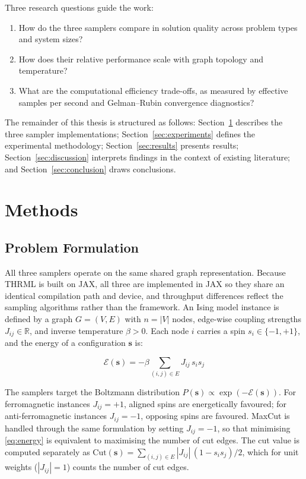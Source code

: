 \documentclass[conference]{IEEEtran}
\begin{document}
Three research questions guide the work:

\begin{enumerate}
  \item How do the three samplers compare in solution quality across problem types and system sizes?
  \item How does their relative performance scale with graph topology and temperature?
  \item What are the computational efficiency trade-offs, as measured by effective samples per second and Gelman--Rubin convergence diagnostics?
\end{enumerate}

The remainder of this thesis is structured as follows: Section~\ref{sec:methods} describes the three sampler implementations; Section~\ref{sec:experiments} defines the experimental methodology; Section~\ref{sec:results} presents results; Section~\ref{sec:discussion} interprets findings in the context of existing literature; and Section~\ref{sec:conclusion} draws conclusions.

\section{Methods}\label{sec:methods}

\subsection{Problem Formulation}

All three samplers operate on the same shared graph representation. Because THRML is built on JAX, all three are implemented in JAX so they share an identical compilation path and device, and throughput differences reflect the sampling algorithms rather than the framework. An Ising model instance is defined by a graph $G = (V, E)$ with $n = |V|$ nodes, edge-wise coupling strengths $J_{ij} \in \mathbb{R}$, and inverse temperature $\beta > 0$. Each node $i$ carries a spin $s_i \in \{-1, +1\}$, and the energy of a configuration $\mathbf{s}$ is:

\begin{equation}
  \mathcal{E}(\mathbf{s}) = -\beta \sum_{(i,j) \in E} J_{ij}\, s_i s_j
  \label{eq:energy}
\end{equation}

The samplers target the Boltzmann distribution $P(\mathbf{s}) \propto \exp(-\mathcal{E}(\mathbf{s}))$. For ferromagnetic instances $J_{ij} = +1$, aligned spins are energetically favoured; for anti-ferromagnetic instances $J_{ij} = -1$, opposing spins are favoured. MaxCut is handled through the same formulation by setting $J_{ij} = -1$, so that minimising \eqref{eq:energy} is equivalent to maximising the number of cut edges. The cut value is computed separately as $\text{Cut}(\mathbf{s}) = \sum_{(i,j) \in E} |J_{ij}|\,(1 - s_i s_j)/2$, which for unit weights ($|J_{ij}| = 1$) counts the number of cut edges.
\end{document}
